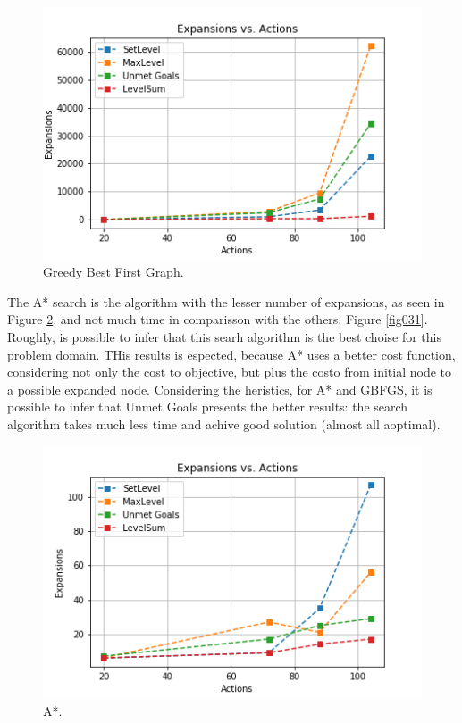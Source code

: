 \documentclass[a4paper]{article}
\begin{document}
\begin{figure}[htpb]
\begin{center}
\includegraphics[width=1\columnwidth]{fig/results_134.png}
\caption{Greedy Best First Graph.}
\end{center}
\label{fig134}
\end{figure}

The A* search is the algorithm with the lesser number of expansions, as seen in Figure \ref{fig034}, and not much time in comparisson with the others, Figure \ref{fig031}. Roughly, is possible to infer that this searh algorithm is the best choise for this problem domain. THis results is espected, because A* uses a better cost function, considering not only the cost to objective, but plus the costo from initial node to a possible expanded node. Considering the heristics, for A* and GBFGS, it is possible to infer that Unmet Goals presents the better results: the search algorithm takes much less time and achive good solution (almost all aoptimal). 

\begin{figure}[htpb]
\begin{center}
\includegraphics[width=1\columnwidth]{fig/results_034.png}
\caption{A*.}
\end{center}
\label{fig034}
\end{figure}
        
\end{document}
